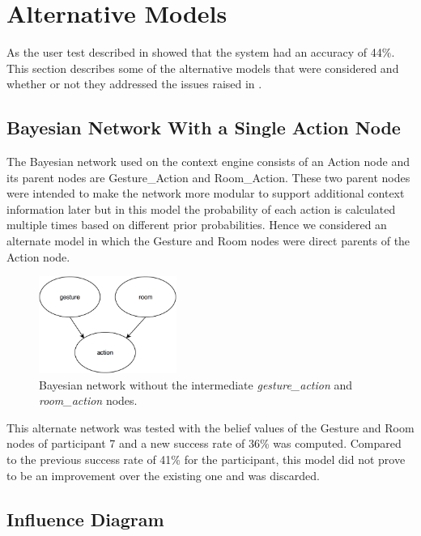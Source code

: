 \section{Alternative Models}
\label{sec:evaluation:alternative-models}

As the user test described in  showed that the system had an accuracy of 44\%. This section describes some of the alternative models that were considered and whether or not they addressed the issues raised in .

\subsection{Bayesian Network With a Single Action Node}

The Bayesian network used on the context engine consists of an Action node and its parent nodes are Gesture\_Action and Room\_Action.
These two parent nodes were intended to make the network more modular to support additional context information later but in this model the probability of each action is calculated multiple times based on different prior probabilities.
Hence we considered an alternate model in which the Gesture and Room nodes were direct parents of the Action node.

\begin{figure}[h]
\centering
\includegraphics[width=0.40\textwidth]{images/DirectParentBaysianNetwork}
\caption{Bayesian network without the intermediate \emph{gesture\_action} and \emph{room\_action} nodes.}
\label{fig:evaluation:alternative-models:direct-parents}
\end{figure}

This alternate network was tested with the belief values of the Gesture and Room nodes of participant 7 and a new success rate of 36\% was computed.
Compared to the previous success rate of 41\% for the participant, this model did not prove to be an improvement over the existing one and was discarded.

\subsection{Influence Diagram}

